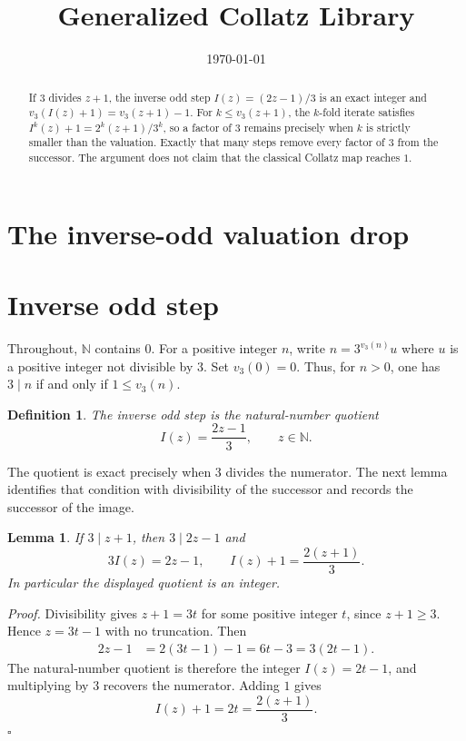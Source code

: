 \documentclass[11pt,letterpaper]{article}
\title{Generalized Collatz Library}
\author{}
\date{\today}
\newcommand{\N}{\mathbb{N}}
\newtheorem{lemma}[theorem]{Lemma}
\newtheorem{definition}[theorem]{Definition}
\newenvironment{proof}{\noindent\textit{Proof.}}{\hfill\(\square\)}
\begin{document}
\maketitle
\section*{The inverse-odd valuation drop}

\begin{abstract}
If \(3\) divides \(z+1\), the inverse odd step \(I(z)=(2z-1)/3\) is an exact integer and \(v_3(I(z)+1)=v_3(z+1)-1\). For \(k\le v_3(z+1)\), the \(k\)-fold iterate satisfies \(I^k(z)+1=2^k(z+1)/3^k\), so a factor of \(3\) remains precisely when \(k\) is strictly smaller than the valuation. Exactly that many steps remove every factor of \(3\) from the successor. The argument does not claim that the classical Collatz map reaches \(1\).
\end{abstract}

\section{Inverse odd step}

Throughout, \(\N\) contains \(0\). For a positive integer \(n\), write \(n=3^{v_3(n)}u\) where \(u\) is a positive integer not divisible by \(3\). Set \(v_3(0)=0\). Thus, for \(n>0\), one has \(3\mid n\) if and only if \(1\le v_3(n)\).

\begin{definition}
The inverse odd step is the natural-number quotient
\[
I(z)=\frac{2z-1}{3},\qquad z\in\N.
\]
\end{definition}

The quotient is exact precisely when \(3\) divides the numerator. The next lemma identifies that condition with divisibility of the successor and records the successor of the image.

\begin{lemma}
\label{lem:exact}
If \(3\mid z+1\), then \(3\mid 2z-1\) and
\[
3I(z)=2z-1,\qquad I(z)+1=\frac{2(z+1)}{3}.
\]
In particular the displayed quotient is an integer.
\end{lemma}

\begin{proof}
Divisibility gives \(z+1=3t\) for some positive integer \(t\), since \(z+1\ge 3\). Hence \(z=3t-1\) with no truncation. Then
\begin{align*}
2z-1
&=2(3t-1)-1
=6t-3
=3(2t-1).
\end{align*}
The natural-number quotient is therefore the integer \(I(z)=2t-1\), and multiplying by \(3\) recovers the numerator. Adding \(1\) gives
\[
I(z)+1=2t=\frac{2(z+1)}{3}.
\]
\end{proof}
\end{document}
